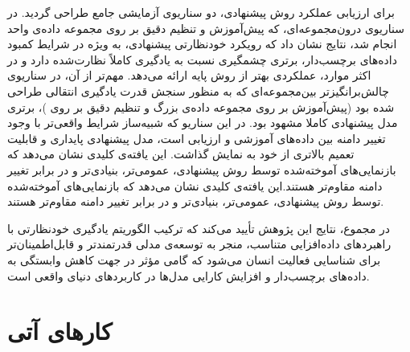 برای ارزیابی عملکرد روش پیشنهادی، دو سناریوی آزمایشی جامع طراحی گردید. در سناریوی درون‌مجموعه‌ای، که پیش‌آموزش و تنظیم دقیق بر روی مجموعه داده‌ی واحد  انجام شد، نتایج نشان داد که رویکرد خودنظارتی پیشنهادی، به ویژه در شرایط کمبود داده‌های برچسب‌دار، برتری چشمگیری نسبت به یادگیری کاملاً نظارت‌شده دارد و در اکثر موارد، عملکردی بهتر از روش پایه ارائه می‌دهد. مهم‌تر از آن، در سناریوی چالش‌برانگیزتر بین‌مجموعه‌ای که به منظور سنجش قدرت یادگیری انتقالی طراحی شده بود (پیش‌آموزش بر روی مجموعه داده‌ی بزرگ  و تنظیم دقیق بر روی )، برتری مدل پیشنهادی کاملا مشهود بود. در این سناریو که شبیه‌ساز شرایط واقعی‌تر با وجود تغییر دامنه بین داده‌های آموزشی و ارزیابی است، مدل پیشنهادی پایداری و قابلیت تعمیم بالاتری از خود به نمایش گذاشت. این یافته‌ی کلیدی نشان می‌دهد که بازنمایی‌های آموخته‌شده توسط روش پیشنهادی، عمومی‌تر، بنیادی‌تر و در برابر تغییر دامنه مقاوم‌تر هستند.این یافته‌ی کلیدی نشان می‌دهد که بازنمایی‌های آموخته‌شده توسط روش پیشنهادی، عمومی‌تر، بنیادی‌تر و در برابر تغییر دامنه مقاوم‌تر هستند.

در مجموع، نتایج این پژوهش تأیید می‌کند که ترکیب الگوریتم یادگیری خودنظارتی  با راهبردهای داده‌افزایی متناسب، منجر به توسعه‌ی مدلی قدرتمندتر و قابل‌اطمینان‌تر برای شناسایی فعالیت انسان می‌شود که گامی مؤثر در جهت کاهش وابستگی به داده‌های برچسب‌دار و افزایش کارایی مدل‌ها در کاربردهای دنیای واقعی است.

\section{کارهای آتی}

